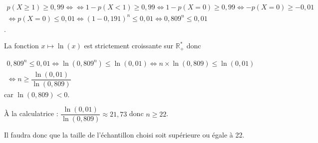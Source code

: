 \documentclass[10pt]{article}
\providecommand{\R}{\mathbb{R}}
\begin{document}
\begin{enumerate}
	$\begin{gathered}p(X\geqslant 1)\geqslant 0,99 \iff  \iff 1-p(X<1)\geqslant 0,99 \iff 1-p(X=0)\geqslant 0,99 \iff -p(X=0)\geqslant -0,01 \\ \iff  p(X=0)\leqslant 0,01 \iff (1-0,191)^n\leqslant 0,01 \iff 0,809^n\leqslant 0,01\end{gathered}$. 
	
La fonction $x\mapsto\ln(x)$ est strictement croissante sur $\R_+^*$ donc
	
	$\begin{gathered}0,809^n\leqslant 0,01 \iff \ln\left(0,809^n \right) \leqslant \ln(0,01) \iff n \times \ln(0,809) \leqslant \ln(0,01) \\ \iff n\geqslant \dfrac{\ln(0,01)}{\ln(0,809)}\end{gathered}$ car $\ln(0,809)<0$. 

À la calculatrice : $\dfrac{\ln(0,01)}{\ln(0,809)}\approx 21,73$ donc $n\geqslant 22$.

Il faudra donc que la taille de l'échantillon choisi soit supérieure ou égale à 22.
\end{enumerate}

\bigskip
\end{document}

